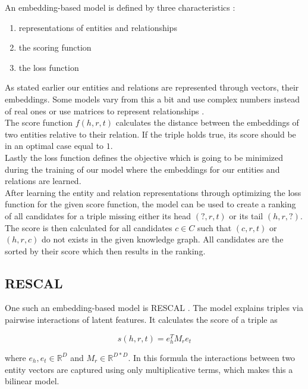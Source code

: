 An embedding-based model is defined by three characteristics \cite{bianchi_knowledge_2020}:

\begin{enumerate}
\item representations of entities and relationships
\item the scoring function
\item the loss function
\end{enumerate}

As stated earlier our entities and relations are represented through vectors, their embeddings. Some models vary from this a bit and use complex numbers instead of real ones \cite{trouillon_complex_2016}  or use matrices to represent relationships \cite{nickel_three-way_2011}.
\\
The score function $f(h,r,t)$ calculates the distance between the embeddings of two entities relative to their relation. If the triple holds true, its score should be in an optimal case equal to $1$. \\
Lastly the loss function defines the objective which is going to be minimized during the training of our model where the embeddings for our entities and relations are learned. \\
After learning the entity and relation representations through optimizing the loss function for the given score function, the model can be used to create a ranking of all candidates for a triple missing either its head $(?,r,t)$ or its tail $(h,r,?)$. The score is then calculated for all candidates $c \in C$ such that $(c,r,t)$ or $(h,r,c)$ do not exists in the given knowledge graph. All candidates are the sorted by their score which then results in the ranking. 

\subsection{RESCAL}
\label{cha:rescal}
One such an embedding-based model is RESCAL \cite{nickel_three-way_2011}\cite{nickel_factorizing_2012}. The model explains triples via pairwise interactions of latent features. It calculates the score of a triple as

\begin{equation}
\label{eq:rescal_score}
s(h,r,t)=e_h^T M_r e_t
\end{equation}

where $e_h, e_t \in \mathbb{R}^D$ and $M_r \in \mathbb{R}^{D*D}$. In this formula the interactions between two entity vectors are captured using only multiplicative terms, which makes this a bilinear model.

